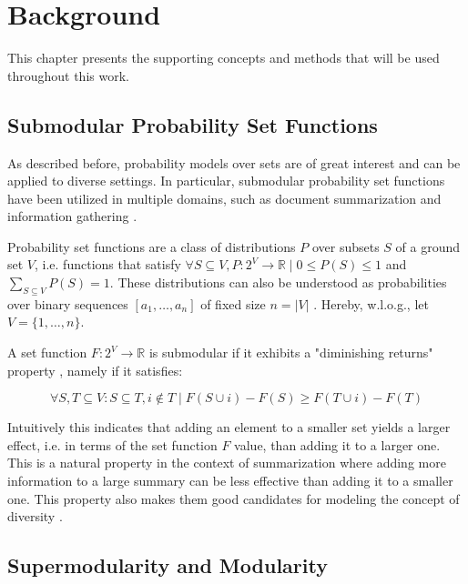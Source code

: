 \chapter{Background}
\label{sec:background}

This chapter presents the supporting concepts and methods that will be used throughout this work.

\section{Submodular Probability Set Functions}

As described before, probability models over sets are of great interest and can be applied to diverse settings. In particular, submodular probability set functions have been utilized in multiple domains, such as document summarization and information gathering \citep{krause14submodular}.

Probability set functions are a class of distributions $P$ over subsets $S$ of a ground set $V$, i.e.  functions that satisfy $\forall S \subseteq V, P: 2^V \rightarrow \mathbb{R} \mid 0 \leq P(S) \leq 1$ and $\sum_{S \subseteq V} P(S) = 1$. These distributions can also be understood as probabilities over binary sequences $[a_{1}, \dots,a_{n}]$ of fixed size $n = |V|$ \citep{bruno99sets}. Hereby, w.l.o.g., let $V = \{1,\dots, n\}$.

A set function $F:2^V \rightarrow \mathbb{R}$ is submodular if it exhibits a "diminishing returns" property \citep{krause14submodular}, namely if it satisfies:

\begin{equation}
  \label{eq:submod-condition}
  \forall S,T \subseteq V : S \subseteq T, i \notin T \mid F(S \cup i) - F(S) \geq F(T \cup i) - F(T)
\end{equation}

Intuitively this indicates that adding an element to a smaller set yields a larger effect, i.e. in terms of the set function $F$ value, than adding it to a larger one. This is a natural property in the context of summarization where adding more information to a large summary can be less effective than adding it to a smaller one. This property also makes them good candidates for modeling the concept of diversity \citep{tschiatschek16learning}.

\section{Supermodularity and Modularity}
\label{sec:modular}

